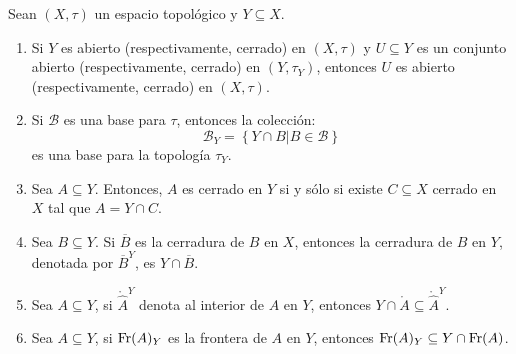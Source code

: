 \documentclass[12pt]{report}
\theoremstyle{largebreak}
\newcommand{\Int}[1]{\ensuremath{\mathring{#1}}}
\newcommand{\Cls}[1]{\ensuremath{\overline{#1}}}
\newcommand{\Fr}[1]{\ensuremath{\textup{Fr}(#1)}}
\begin{document}
    \begin{propo}
        Sean $(X,\tau)$ un espacio topológico y $Y\subseteq X$.
        \begin{enumerate}
            \item Si $Y$ es abierto (respectivamente, cerrado) en $(X,\tau)$ y $U\subseteq Y$ es un conjunto abierto (respectivamente, cerrado) en $(Y,\tau_Y)$, entonces $U$ es abierto (respectivamente, cerrado) en $(X,\tau)$.
            \item Si $\mathcal{B}$ es una base para $\tau$, entonces la colección:
            \begin{equation*}
                \mathcal{B}_Y=\left\{Y\cap B\Big| B\in\mathcal{B} \right\}
            \end{equation*}
            es una base para la topología $\tau_Y$.
            \item Sea $A\subseteq Y$. Entonces, $A$ es cerrado en $Y$ si y sólo si existe $C\subseteq X$ cerrado en $X$ tal que $A=Y\cap C$.
            \item Sea $B\subseteq Y$. Si $\Cls{B}$ es la cerradura de $B$ en $X$, entonces la cerradura de $B$ en $Y$, denotada por $\Cls{B}^Y$, es $Y\cap \Cls{B}$.
            \item Sea $A\subseteq Y$, si $\Int{\widehat{A}}^Y$ denota al interior de $A$ en $Y$, entonces $Y\cap\Int{A}\subseteq \Int{\widehat{A}}^Y$.
            \item Sea $A\subseteq Y$, si $\Fr{A}_Y$ es la frontera de $A$ en $Y$, entonces $\Fr{A}_Y\subseteq Y\cap \Fr{A}$.
        \end{enumerate}
    \end{propo}
\end{document}
